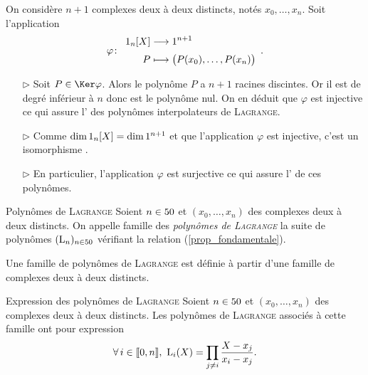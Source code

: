 \begin{preuve}
    On considère $n + 1$ complexes deux à deux distincts, notés $x_0, \dots, x_n$. Soit l'application
    $$
    \fonction[\varphi]{\R_n[X]}{\R^{n+1}}{P}{\big(P(x_0), \dots, P(x_n) \big)}.
    $$
    \begin{itemize}
        \item[$\rhd$] Soit $P \in \Ker \varphi$. Alors le polynôme $P$ a $n+1$ racines discintes. Or il est de degré inférieur à $n$ donc est le polynôme nul. On en déduit que $\varphi$ est injective ce qui assure l' des polynômes interpolateurs de \textsc{Lagrange}.
        \item[$\rhd$] Comme $\dim 1_n[X] = \dim 1^{n+1}$ et que l'application $\varphi$ est injective, c'est un isomorphisme \note.
        \item[$\rhd$] En particulier, l'application $\varphi$ est surjective ce qui assure l' de ces polynômes. 
    \end{itemize}
\end{preuve}

\begin{defi}{Polynômes de \textsc{Lagrange}}
    Soient $n \in 50$ et $(x_0, \dots, x_n)$ des complexes deux à deux distincts. On appelle famille des \emph{polynômes de \textsc{Lagrange}} la suite de polynômes $(\mathrm{L}_n)_{n \in 50}$ vérifiant la relation (\ref{prop_fondamentale}).
\end{defi}

\begin{remarque}
    Une famille de polynômes de \textsc{Lagrange} est définie à partir d'une famille de complexes deux à deux distincts. 
\end{remarque}

\begin{prop}{Expression des polynômes de \textsc{Lagrange}}
    Soient $n \in 50$ et $(x_0, \dots, x_n)$ des complexes deux à deux distincts. Les polynômes de \textsc{Lagrange} associés à cette famille ont pour expression
    $$\forall i \in \llbracket 0, n \rrbracket,\ \Lag_i(X) = \prod_{j \neq i} \frac{X-x_j}{x_i - x_j}.$$
\end{prop}

